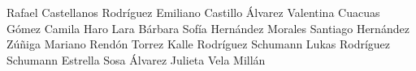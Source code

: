 Rafael Castellanos Rodríguez
Emiliano Castillo Álvarez
Valentina Cuacuas Gómez
Camila Haro Lara
Bárbara Sofía Hernández Morales
Santiago Hernández Zúñiga
Mariano Rendón Torrez
Kalle Rodríguez Schumann
Lukas Rodríguez Schumann
Estrella Sosa Álvarez
Julieta Vela Millán

